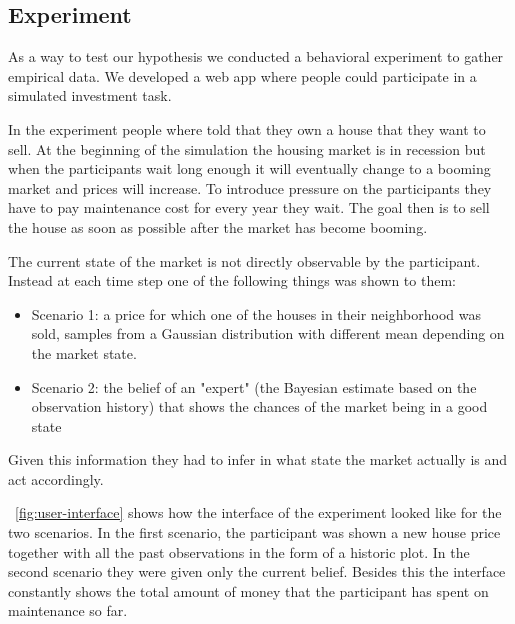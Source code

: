 \subsection{Experiment}

As a way to test our hypothesis we conducted a behavioral experiment to gather empirical data. We developed a web app where people could participate in a simulated investment task.

In the experiment people where told that they own a house that they want to sell. At the beginning of the simulation the housing market is in recession but when the participants wait long enough it will eventually change to a booming market and prices will increase. To introduce pressure on the participants they have to pay maintenance cost for every year they wait.
The goal then is to sell the house as soon as possible after the market has become booming.

The current state of the market is not directly observable by the participant. Instead at each time step one of the following things was shown to them:
\begin{itemize}
    \item Scenario 1: a price for which one of the houses in their neighborhood was sold, samples from a Gaussian distribution with different mean depending on the market state.
    \item Scenario 2: the belief of an "expert" (the Bayesian estimate based on the observation history) that shows the chances of the market being in a good state
\end{itemize}

Given this information they had to infer in what state the market actually is and act accordingly.

~\autoref{fig:user-interface} shows how the interface of the experiment looked like for the two scenarios. In the first scenario, the participant was shown a new house price together with all the past observations in the form of a historic plot. In the second scenario they were given only the current belief. Besides this the interface constantly shows the total amount of money that the participant has spent on maintenance so far.

